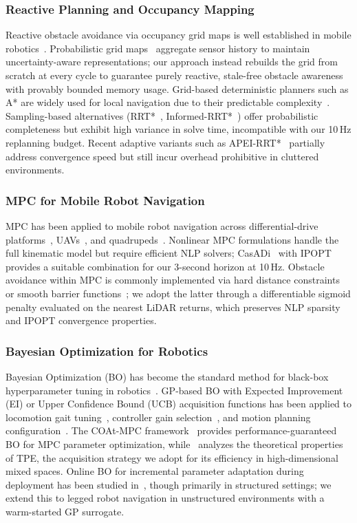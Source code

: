 \documentclass[conference]{IEEEtran}
\begin{document}
\subsubsection{Reactive Planning and Occupancy Mapping}
Reactive obstacle avoidance via occupancy grid maps is well established in mobile robotics~\cite{@TODO}. Probabilistic grid maps~\cite{@TODO} aggregate sensor history to maintain uncertainty-aware representations; our approach instead rebuilds the grid from scratch at every cycle to guarantee purely reactive, stale-free obstacle awareness with provably bounded memory usage. Grid-based deterministic planners such as A* are widely used for local navigation due to their predictable complexity~\cite{@TODO}. Sampling-based alternatives (RRT*~\cite{@TODO}, Informed-RRT*~\cite{@TODO}) offer probabilistic completeness but exhibit high variance in solve time, incompatible with our 10\,Hz replanning budget. Recent adaptive variants such as APEI-RRT*~\cite{10796871} partially address convergence speed but still incur overhead prohibitive in cluttered environments.

\subsubsection{MPC for Mobile Robot Navigation}
MPC has been applied to mobile robot navigation across differential-drive platforms~\cite{@TODO}, UAVs~\cite{10896285}, and quadrupeds~\cite{@TODO}. Nonlinear MPC formulations handle the full kinematic model but require efficient NLP solvers; CasADi~\cite{@TODO} with IPOPT~\cite{@TODO} provides a suitable combination for our 3-second horizon at 10\,Hz. Obstacle avoidance within MPC is commonly implemented via hard distance constraints~\cite{@TODO} or smooth barrier functions~\cite{@TODO}; we adopt the latter through a differentiable sigmoid penalty evaluated on the nearest LiDAR returns, which preserves NLP sparsity and IPOPT convergence properties.

\subsubsection{Bayesian Optimization for Robotics}
Bayesian Optimization (BO) has become the standard method for black-box hyperparameter tuning in robotics~\cite{@TODO}. GP-based BO with Expected Improvement (EI) or Upper Confidence Bound (UCB) acquisition functions has been applied to locomotion gait tuning~\cite{@TODO}, controller gain selection~\cite{@TODO}, and motion planning configuration~\cite{@TODO}. The COAt-MPC framework~\cite{10924398} provides performance-guaranteed BO for MPC parameter optimization, while~\cite{watanabe2025treestructuredparzenestimatorunderstanding} analyzes the theoretical properties of TPE, the acquisition strategy we adopt for its efficiency in high-dimensional mixed spaces. Online BO for incremental parameter adaptation during deployment has been studied in~\cite{@TODO}, though primarily in structured settings; we extend this to legged robot navigation in unstructured environments with a warm-started GP surrogate.
\end{document}
